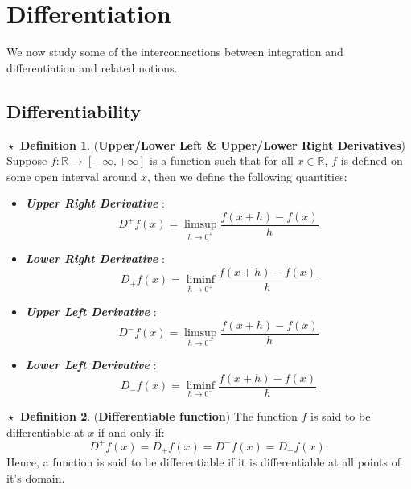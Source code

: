 \documentclass{article}
\theoremstyle{definition}
\newtheorem{definition}{$\boxed{\star}$ Definition}
\theoremstyle{remark}
\theoremstyle{definition}
\theoremstyle{definition}
\theoremstyle{definition}
\newcommand{\R}{\mathbb{R}}
\begin{document}
\newpage
\section{Differentiation}
We now study some of the interconnections between integration and differentiation and related notions.
\subsection{Differentiability}
\begin{definition}
	(\textbf{Upper/Lower Left \& Upper/Lower Right Derivatives}) Suppose $ f : \R \longrightarrow [-\infty,+\infty]$ is a function such that for all $ x \in \R $, $ f $ is defined on some open interval around $ x $, then we define the following quantities:
	\begin{itemize}
		\item {\textbf{\emph{Upper Right Derivative}} : 
	\[D^{+}f(x) = \limsup_{h\to 0^{+}} \frac{f(x+h) - f(x)}{h}\]	
	}
\item {\textbf{\emph{Lower Right Derivative}} : 
\[D_{+}f(x) = \liminf_{h\to 0^{+}} \frac{f(x+h) - f(x)}{h}\]
}
\item {\textbf{\emph{Upper Left Derivative}} : 
\[D^{-}f(x) = \limsup_{h\to 0^{-}}\frac{f(x+h) - f(x)}{h}\]
}
\item {\textbf{\emph{Lower Left Derivative}} : 
\[D_{-}f(x) = \liminf_{h\to 0^{-}} \frac{f(x+h) - f(x)}{h}\]
}
	\end{itemize}
\end{definition}
\hrulefill
\begin{definition}
	(\textbf{Differentiable function}) The function $ f $ is said to be differentiable at $ x $ if and only if:
	\[D^{+}f(x) = D_{+}f(x) = D^{-}f(x) = D_{-}f(x).\]
	Hence, a function is said to be differentiable if it is differentiable at all points of it's domain. 
\end{definition}
\hrulefill
\end{document}

